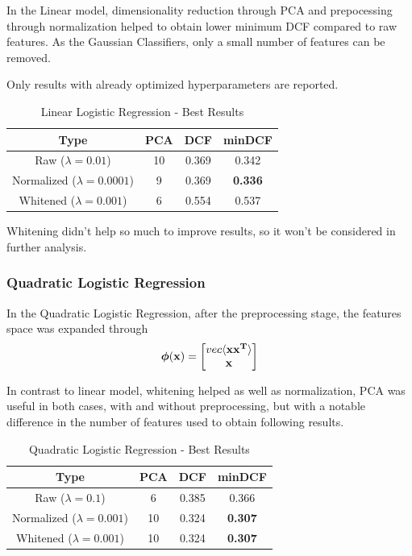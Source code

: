 \documentclass[12pt, twocolumn]{article}
\begin{document}
In the Linear model, dimensionality reduction through PCA and prepocessing through normalization
helped to obtain lower minimum DCF compared to raw features. As the Gaussian Classifiers, only a small number
of features can be removed.

Only results with already optimized hyperparameters are reported.
\begin{table}[H]
    \centering
        \begin{tabular}{||c|c|c|c||}
            \hline
            Type & PCA & DCF & minDCF \\
            \hline
            \hline
            Raw ($\lambda = 0.01$) & 10 & 0.369 &  0.342  \\
            Normalized ($\lambda = 0.0001$) & 9 & 0.369 &  {\bf 0.336}  \\
            Whitened ($\lambda = 0.001$) & 6 & 0.554 &  0.537  \\
            \hline
    \end{tabular}
    \caption{Linear Logistic Regression - Best Results}
\end{table}

Whitening didn't help so much to improve results, so it won't be considered in further analysis.
\subsubsection{Quadratic Logistic Regression}

In the Quadratic Logistic Regression, after the preprocessing stage, the features space
was expanded through 
$$ {\bf \boldsymbol{\phi}(x)} = {
    \begin{bmatrix}
    vec\langle{\bf xx^T}\rangle\\
    {\bf x}
    \end{bmatrix}}
$$ 

In contrast to linear model, whitening helped as well as normalization, PCA
was useful in both cases, with and without preprocessing, but with a notable difference
in the number of features used to obtain following results.

\begin{table}[H]
    \centering
        \begin{tabular}{||c|c|c|c||}
            \hline
            Type & PCA & DCF & minDCF \\
            \hline
            \hline
            Raw ($\lambda = 0.1$) & 6 & 0.385 &  0.366  \\
            Normalized ($\lambda = 0.001$) & 10 & 0.324 &  {\bf 0.307}  \\
            Whitened ($\lambda = 0.001$) & 10 & 0.324 &  {\bf 0.307}  \\
            \hline
    \end{tabular}
    \caption{Quadratic Logistic Regression - Best Results}
\end{table}
\end{document}
